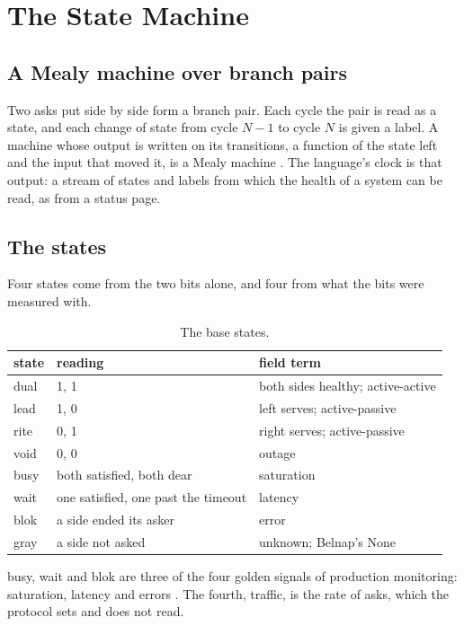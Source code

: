 \chapter{The State Machine}
\label{ch:states}

\section{A Mealy machine over branch pairs}

Two asks put side by side form a branch pair. Each cycle the pair is read as a state, and each
change of state from cycle \(N-1\) to cycle \(N\) is given a label. A machine whose output is
written on its transitions, a function of the state left and the input that moved it, is a Mealy
machine \cite{src:Mealy}. The language's clock is that output: a stream of states and labels from
which the health of a system can be read, as from a status page.

\section{The states}

Four states come from the two bits alone, and four from what the bits were measured with.

\begin{table}[h]
\centering
\small
\begin{tabular}{@{}l l p{6.4cm}@{}}
\toprule
state & reading & field term \\
\midrule
dual & 1, 1 & both sides healthy; active-active \\
lead & 1, 0 & left serves; active-passive \\
rite & 0, 1 & right serves; active-passive \\
void & 0, 0 & outage \\
busy & both satisfied, both dear & saturation \\
wait & one satisfied, one past the timeout & latency \\
blok & a side ended its asker & error \\
gray & a side not asked & unknown; Belnap's None \\
\bottomrule
\end{tabular}
\caption{The base states.}
\label{tab:states}
\end{table}

busy, wait and blok are three of the four golden signals of production monitoring: saturation,
latency and errors \cite{src:SRE}. The fourth, traffic, is the rate of asks, which the protocol
sets and does not read.

